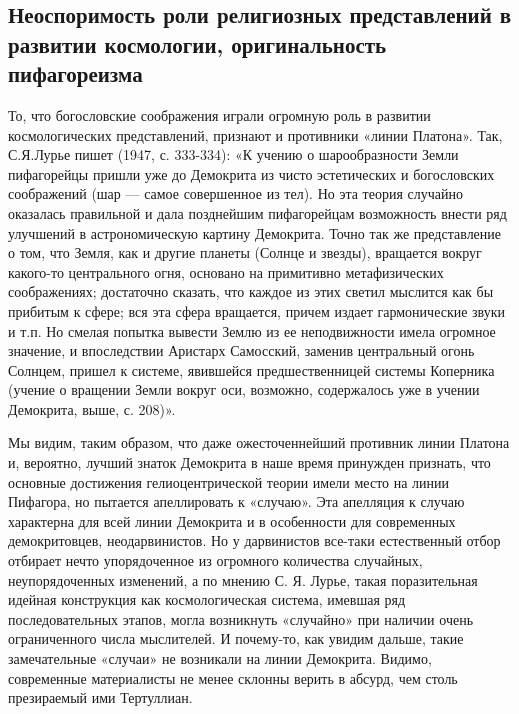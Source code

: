 \subsection{Неоспоримость роли религиозных представлений в развитии
космологии, оригинальность пифагореизма}

То, что богословские соображения играли огромную роль в развитии
космологических представлений, признают и противники «линии Платона».
Так, С.Я.Лурье пишет (1947, с. 333-334): «К учению о шарообразности
Земли пифагорейцы пришли уже до Демокрита из чисто эстетических и
богословских соображений (шар --- самое совершенное из тел). Но эта
теория случайно оказалась правильной и дала позднейшим пифагорейцам
возможность внести ряд улучшений в астрономическую картину Демокрита.
Точно так же представление о том, что Земля, как и другие планеты
(Солнце и звезды), вращается вокруг какого-то центрального огня,
основано на примитивно метафизических соображениях; достаточно
сказать, что каждое из этих светил мыслится как бы прибитым к сфере;
вся эта сфера вращается, причем издает гармонические звуки и т.п. Но
смелая попытка вывести Землю из ее неподвижности имела огромное
значение, и впоследствии Аристарх Самосский, заменив центральный огонь
Солнцем, пришел к системе, явившейся предшественницей системы
Коперника (учение о вращении Земли вокруг оси, возможно, содержалось
уже в учении Демокрита, выше, с. 208)».

Мы видим, таким образом, что даже ожесточеннейший противник линии
Платона и, вероятно, лучший знаток Демокрита в наше время принужден
признать, что основные достижения гелиоцентрической теории имели место
на линии Пифагора, но пытается апеллировать к «случаю». Эта апелляция
к случаю характерна для всей линии Демокрита и в особенности для
современных демокритовцев, неодарвинистов. Но у дарвинистов все-таки
естественный отбор отбирает нечто упорядоченное из огромного
количества случайных, неупорядоченных изменений, а по мнению С. Я.
Лурье, такая поразительная идейная конструкция как космологическая
система, имевшая ряд последовательных этапов, могла возникнуть
«случайно» при наличии очень ограниченного числа мыслителей. И
почему-то, как увидим дальше, такие замечательные «случаи» не
возникали на линии Демокрита. Видимо, современные материалисты не
менее склонны верить в абсурд, чем столь презираемый ими Тертуллиан.

